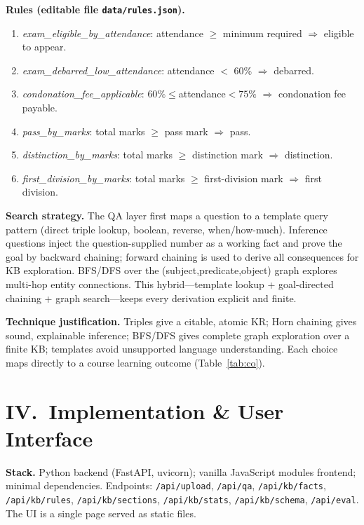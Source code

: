 \documentclass[10pt,twocolumn]{article}
\begin{document}
\textbf{Rules (editable file \texttt{data/rules.json}).}
\begin{enumerate}[leftmargin=*,nosep]
\item \emph{exam\_eligible\_by\_attendance}: attendance $\ge$ minimum required
  $\Rightarrow$ eligible to appear.
\item \emph{exam\_debarred\_low\_attendance}: attendance $<$ 60\% $\Rightarrow$ debarred.
\item \emph{condonation\_fee\_applicable}: $60\%\le$attendance$<75\%$ $\Rightarrow$
  condonation fee payable.
\item \emph{pass\_by\_marks}: total marks $\ge$ pass mark $\Rightarrow$ pass.
\item \emph{distinction\_by\_marks}: total marks $\ge$ distinction mark $\Rightarrow$ distinction.
\item \emph{first\_division\_by\_marks}: total marks $\ge$ first-division mark $\Rightarrow$ first division.
\end{enumerate}

\textbf{Search strategy.} The QA layer first maps a question to a template query
pattern (direct triple lookup, boolean, reverse, when/how-much). Inference
questions inject the question-supplied number as a working fact and prove the
goal by backward chaining; forward chaining is used to derive all consequences
for KB exploration. BFS/DFS over the (subject,predicate,object) graph explores
multi-hop entity connections. This hybrid---template lookup + goal-directed
chaining + graph search---keeps every derivation explicit and finite.

\textbf{Technique justification.} Triples give a citable, atomic KR; Horn chaining
gives sound, explainable inference; BFS/DFS gives complete graph exploration over
a finite KB; templates avoid unsupported language understanding. Each choice maps
directly to a course learning outcome (Table~\ref{tab:co}).

\section*{IV.~Implementation \& User Interface}
\textbf{Stack.} Python backend (FastAPI, uvicorn); vanilla JavaScript modules
frontend; minimal dependencies. Endpoints: \texttt{/api/upload}, \texttt{/api/qa},
\texttt{/api/kb/facts}, \texttt{/api/kb/rules}, \texttt{/api/kb/sections},
\texttt{/api/kb/stats}, \texttt{/api/kb/schema}, \texttt{/api/eval}. The UI is a
single page served as static files.
\end{document}
